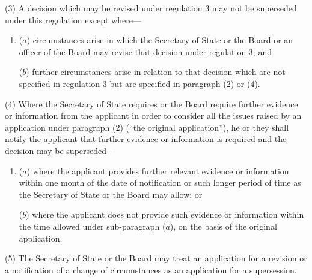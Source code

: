 \documentclass[12pt,a4paper]{article}
\begin{document}
(3) A decision which may be revised under regulation 3 may not be superseded under this regulation except where—
\begin{enumerate}\item[]
($a$) circumstances arise in which the Secretary of State 
or the Board or an officer of the Board  %
may revise that decision under regulation 3; and

($b$) further circumstances arise in relation to that decision which are not specified in regulation 3 but are specified in paragraph (2) or (4).
\end{enumerate}

(4) Where the Secretary of State requires 
or the Board require  %
further evidence or information from the applicant in order to consider all the issues raised by an application under paragraph (2) (“the original application”), he 
or they  %
shall notify the applicant that further evidence or information is required and the decision may be superseded—
\begin{enumerate}\item[]
($a$) where the applicant provides further relevant evidence or information within one month of the date of notification or such longer period of time as the Secretary of State 
or the Board  %
may allow; or

($b$) where the applicant does not provide such evidence or information within the time allowed under sub-paragraph ($a$), on the basis of the original application.
\end{enumerate}

(5) The Secretary of State 
or the Board  %
may treat an application for a revision or a notification of a change of circumstances as an application for a supersession.
\end{document}
